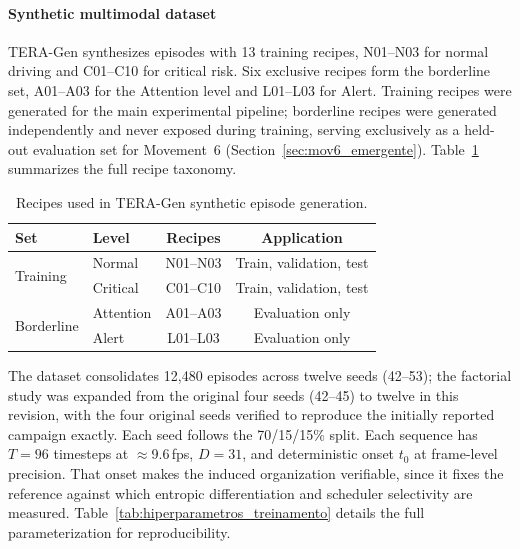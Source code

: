 \documentclass[a4paper,fleqn]{cas-dc}
\newcommand{\TERAGen}{\mbox{TERA-Gen}\xspace}
\begin{document}
\paragraph{Synthetic multimodal dataset}
\TERAGen synthesizes episodes with 13 training recipes, N01--N03 for
normal driving and C01--C10 for critical risk. Six exclusive recipes
form the borderline set, A01--A03 for the Attention level and L01--L03
for Alert. Training recipes were generated for the main experimental
pipeline; borderline recipes were generated independently and never
exposed during training, serving exclusively as a held-out evaluation
set for Movement~6 (Section~\ref{sec:mov6_emergente}).
Table~\ref{tab:receitas} summarizes the full recipe taxonomy.
\begin{table}[!tbp]
\centering
\caption{Recipes used in \mbox{TERA-Gen} synthetic episode generation.}
\label{tab:receitas}
\footnotesize
\setlength{\tabcolsep}{4pt}
\renewcommand{\arraystretch}{1.15}
\begin{tabular}{l l c c}
\toprule
\textbf{Set} & \textbf{Level}
  & \textbf{Recipes} & \textbf{Application} \\
\midrule
\multirow{2}{*}{Training} & Normal   & N01--N03 & Train, validation, test \\
                          & Critical & C01--C10 & Train, validation, test \\
\midrule
\multirow{2}{*}{Borderline} & Attention & A01--A03 & Evaluation only \\
                            & Alert     & L01--L03 & Evaluation only \\
\bottomrule
\end{tabular}
\end{table}
The dataset consolidates {\color{\revcolor}12,480 episodes across twelve seeds
(42--53); the factorial study was expanded from the original four seeds (42--45)
to twelve in this revision, with the four original seeds verified to reproduce
the initially reported campaign exactly. Each seed follows} the
70/15/15\% split. Each sequence has $T=96$ timesteps at $\approx$9.6\,fps,
$D=31$, and deterministic onset $t_0$ at frame-level precision. That onset makes
the induced organization verifiable, since it fixes the reference against which
entropic differentiation and scheduler selectivity are measured.
Table~\ref{tab:hiperparametros_treinamento} details the full parameterization
for reproducibility.
\end{document}
